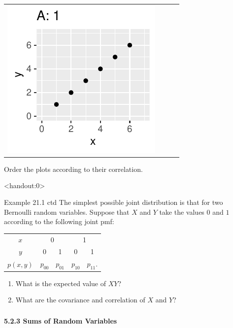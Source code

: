 \begin{frame}
\begin{block}{\examplectd}
\begin{center}
\begin{tabular}{cccc}
        \includegraphics[height=.35\textheight]{figure/exercise-26-2b-1} 
      \end{tabular}
    \end{center}
    Order the plots according to their correlation.
    
  \end{block}
\end{frame}

\begin{frame}<handout:0>
  \begin{block}{Example 21.1 ctd}
    The simplest possible joint distribution is that for two Bernoulli random variables. Suppose that $X$ and $Y$ take the values $0$ and $1$ according to the following joint pmf:

    \begin{center}
      \begin{tabular}{c|cccc}
        $x$ & \multicolumn{2}{c}{0} & \multicolumn{2}{c}{1}\\
        $y$ & 0 & 1 & 0 & 1\\
        \hline
        $p(x,y)$ & $p_{00}$ & $p_{01}$ & $p_{10}$ & $p_{11}$.
      \end{tabular}
    \end{center}
    \begin{enumerate}
    \item What is the expected value of $XY$?
    \item What are the covariance and correlation of $X$ and $Y$?
    \end{enumerate}
  \end{block}
\end{frame}

\begin{frame}
  \frametitle{}
  
  \begin{center}
    \Large{\textbf{5.2.3 Sums of Random Variables}}
  \end{center}
  
\end{frame}


